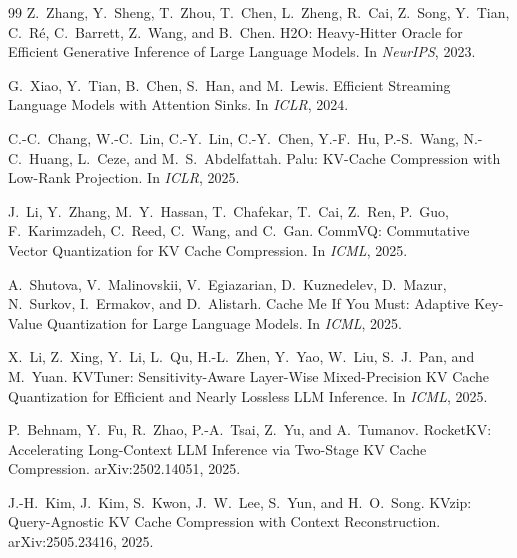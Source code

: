 \documentclass[11pt]{article}
\theoremstyle{plain}
\theoremstyle{definition}
\begin{document}
\begin{thebibliography}{99}
 Z.~Zhang, Y.~Sheng, T.~Zhou, T.~Chen, L.~Zheng, R.~Cai,
Z.~Song, Y.~Tian, C.~R\'e, C.~Barrett, Z.~Wang, and B.~Chen.
\newblock H2O: Heavy-Hitter Oracle for Efficient Generative Inference of
Large Language Models.
\newblock In \emph{NeurIPS}, 2023.

 G.~Xiao, Y.~Tian, B.~Chen, S.~Han, and M.~Lewis.
\newblock Efficient Streaming Language Models with Attention Sinks.
\newblock In \emph{ICLR}, 2024.

 C.-C.~Chang, W.-C.~Lin, C.-Y.~Lin, C.-Y.~Chen, Y.-F.~Hu,
P.-S.~Wang, N.-C.~Huang, L.~Ceze, and M.~S.~Abdelfattah.
\newblock Palu: KV-Cache Compression with Low-Rank Projection.
\newblock In \emph{ICLR}, 2025.

 J.~Li, Y.~Zhang, M.~Y.~Hassan, T.~Chafekar, T.~Cai,
Z.~Ren, P.~Guo, F.~Karimzadeh, C.~Reed, C.~Wang, and C.~Gan.
\newblock CommVQ: Commutative Vector Quantization for KV Cache Compression.
\newblock In \emph{ICML}, 2025.

 A.~Shutova, V.~Malinovskii, V.~Egiazarian, D.~Kuznedelev,
D.~Mazur, N.~Surkov, I.~Ermakov, and D.~Alistarh.
\newblock Cache Me If You Must: Adaptive Key-Value Quantization for Large
Language Models.
\newblock In \emph{ICML}, 2025.

 X.~Li, Z.~Xing, Y.~Li, L.~Qu, H.-L.~Zhen, Y.~Yao,
W.~Liu, S.~J.~Pan, and M.~Yuan.
\newblock KVTuner: Sensitivity-Aware Layer-Wise Mixed-Precision KV Cache
Quantization for Efficient and Nearly Lossless LLM Inference.
\newblock In \emph{ICML}, 2025.

 P.~Behnam, Y.~Fu, R.~Zhao, P.-A.~Tsai, Z.~Yu, and
A.~Tumanov.
\newblock RocketKV: Accelerating Long-Context LLM Inference via Two-Stage
KV Cache Compression.
\newblock arXiv:2502.14051, 2025.

 J.-H.~Kim, J.~Kim, S.~Kwon, J.~W.~Lee, S.~Yun, and
H.~O.~Song.
\newblock KVzip: Query-Agnostic KV Cache Compression with Context Reconstruction.
\newblock arXiv:2505.23416, 2025.

\end{thebibliography}
\end{document}
